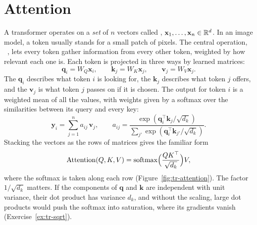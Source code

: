 \section{Attention}\label{sec:tr-attention}
A transformer operates on a \emph{set} of $n$ vectors called ,
$\mathbf{x}_1,\dots,\mathbf{x}_n\in\mathbb{R}^d$. In an image model, a token usually stands for a small patch
of pixels. The central operation, ~\citep{attention}, lets every token gather information from every
other token, weighted by how relevant each one is. Each token is projected in three ways by learned
matrices:
\begin{equation}
\mathbf{q}_i = W_Q\mathbf{x}_i, \qquad \mathbf{k}_j = W_K\mathbf{x}_j, \qquad \mathbf{v}_j = W_V\mathbf{x}_j .
\end{equation}
The  $\mathbf{q}_i$ describes what token $i$ is looking for, the 
$\mathbf{k}_j$ describes what token $j$ offers, and the  $\mathbf{v}_j$ is what token
$j$ passes on if it is chosen. The output for token $i$ is a weighted mean of all the values, with
weights given by a softmax over the similarities between its query and every key:
\begin{equation}
\mathbf{y}_i = \sum_{j=1}^{n} a_{ij}\,\mathbf{v}_j, \qquad
a_{ij} = \frac{\exp(\mathbf{q}_i^{\top}\mathbf{k}_j/\sqrt{d_k})}{\sum_{j'}\exp(\mathbf{q}_i^{\top}\mathbf{k}_{j'}/\sqrt{d_k})}.
\end{equation}
Stacking the vectors as the rows of matrices gives the familiar form
\begin{equation}
\operatorname{Attention}(Q,K,V) = \operatorname{softmax}\!\Big(\frac{QK^{\top}}{\sqrt{d_k}}\Big)V,
\label{eq:tr-attention}
\end{equation}
where the softmax is taken along each row (Figure~\ref{fig:tr-attention}). The factor $1/\sqrt{d_k}$
matters. If the components of $\mathbf{q}$ and $\mathbf{k}$ are independent with unit variance, their
dot product has variance $d_k$, and without the scaling, large dot products would push the softmax
into saturation, where its gradients vanish (Exercise~\ref{ex:tr-sqrt}).

